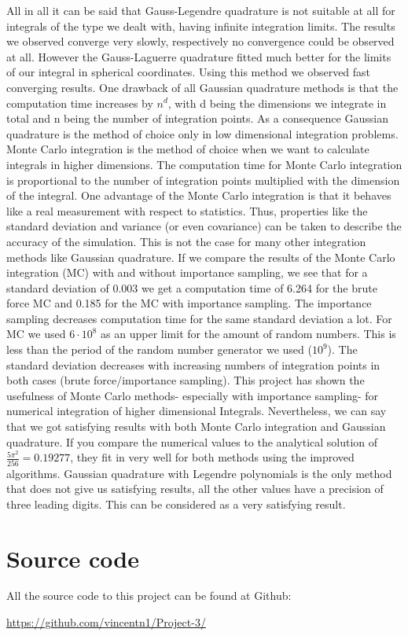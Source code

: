 \documentclass[10pt,a4paper]{article}
\begin{document}
All in all it can be said that Gauss-Legendre quadrature is not suitable at all for integrals of the type we dealt with, having infinite integration limits. The results we observed converge very slowly, respectively no convergence could be observed at all. However the Gauss-Laguerre quadrature fitted much better for the limits of our integral in spherical coordinates. Using this method we observed fast converging results. One drawback of all Gaussian quadrature methods is that the computation time increases by $n^d$, with d being the dimensions we integrate in total and n being the number of integration points. As a consequence Gaussian quadrature is the method of choice only in low dimensional integration problems.
Monte Carlo integration is the method of choice when we want to calculate integrals in higher dimensions. The computation time for Monte Carlo integration is proportional to the number of integration points multiplied with the dimension of the integral. One advantage of the Monte Carlo integration is that it behaves like a real measurement with respect to statistics. Thus, properties like the standard deviation and variance (or even covariance) can be taken to describe the accuracy of the simulation. This is not the case for many other integration methods like Gaussian quadrature. If we compare the results of the Monte Carlo integration (MC) with and without importance sampling, we see that for a standard deviation of 0.003 we get a computation time of 6.264 for the brute force MC and 0.185 for the MC with importance sampling. The importance sampling decreases computation time for the same standard deviation a lot. For MC we used $6 \cdot 10^{8}$ as an upper limit for the amount of random numbers. This is less than the period of the random number generator we used ($10^{9}$). The standard deviation decreases with increasing numbers of integration points in both cases (brute force/importance sampling). This project has shown the usefulness of Monte Carlo methods- especially with importance sampling- for numerical integration of higher dimensional Integrals.
Nevertheless, we can say that we got satisfying results with both Monte Carlo integration and Gaussian quadrature. If you compare the numerical values to the analytical solution of $\frac{5\pi^2}{256}=0.19277$, they fit in very well for both methods using the improved algorithms. Gaussian quadrature with Legendre polynomials is the only method that does not give us satisfying results, all the other values have a precision of three leading digits. This can be considered as a very satisfying result.



\section{Source code}

All the source code to this project can be found at Github:

\url{https://github.com/vincentn1/Project-3/}
\end{document}
